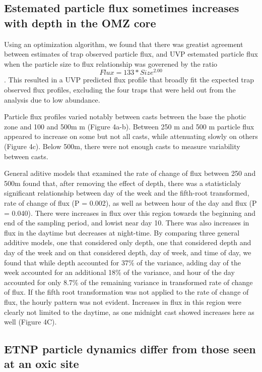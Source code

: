 \documentclass[]{article}
\begin{document}
\hypertarget{estemated-particle-flux-sometimes-increases-with-depth-in-the-omz-core}{%
\subsection{Estemated particle flux sometimes increases with depth in
the OMZ
core}\label{estemated-particle-flux-sometimes-increases-with-depth-in-the-omz-core}}

Using an optimization algorithm, we found that there was greatist
agreement between estimates of trap observed particle flux, and UVP
estemated particle flux when the particle size to flux relationship was
goverened by the ratio \[Flux = 133 * Size ^ {2.00}\]. This resulted in
a UVP predicted flux profile that broadly fit the expected trap observed
flux profiles, excluding the four traps that were held out from the
analysis due to low abundance.

Particle flux profiles varied notably between casts between the base the
photic zone and 100 and 500m m (Figure 4a-b). Between 250 m and 500 m
particle flux appeared to increase on some but not all casts, while
attenuating slowly on others (Figure 4c). Below 500m, there were not
enough casts to measure variability between casts.

General aditive models that examined the rate of change of flux between
250 and 500m found that, after removing the effect of depth, there was a
statisticlaly significant relationship between day of the week and the
fifth-root transformed, rate of change of flux (P = 0.002), as well as
between hour of the day and flux (P = 0.040). There were increases in
flux over this region towards the beginning and end of the sampling
period, and lowist near day 10. There was also increases in flux in the
daytime but decreases at night-time. By comparing three general additive
models, one that considered only depth, one that considered depth and
day of the week and on that considered depth, day of week, and time of
day, we found that while depth accounted for 37\% of the variance,
adding day of the week accounted for an additional 18\% of the variance,
and hour of the day accounted for only 8.7\% of the remaining variance
in transformed rate of change of flux. If the fifth root transformation
was not applied to the rate of change of flux, the hourly pattern was
not evident. Increases in flux in this region were clearly not limited
to the daytime, as one midnight cast showed increases here as well
(Figure 4C).

\hypertarget{etnp-particle-dynamics-differ-from-those-seen-at-an-oxic-site}{%
\subsection{ETNP particle dynamics differ from those seen at an oxic
site}\label{etnp-particle-dynamics-differ-from-those-seen-at-an-oxic-site}}
\end{document}

